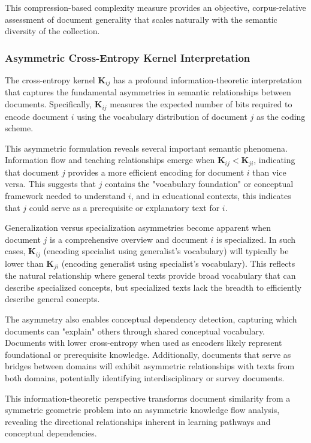 \documentclass[12pt,a4paper]{article}
\begin{document}
This compression-based complexity measure provides an objective, corpus-relative assessment of document generality that scales naturally with the semantic diversity of the collection.


\subsubsection{Asymmetric Cross-Entropy Kernel Interpretation}

The cross-entropy kernel $\mathbf{K}_{ij}$ has a profound information-theoretic interpretation that captures the fundamental asymmetries in semantic relationships between documents. Specifically, $\mathbf{K}_{ij}$ measures the expected number of bits required to encode document $i$ using the vocabulary distribution of document $j$ as the coding scheme.

This asymmetric formulation reveals several important semantic phenomena. Information flow and teaching relationships emerge when $\mathbf{K}_{ij} < \mathbf{K}_{ji}$, indicating that document $j$ provides a more efficient encoding for document $i$ than vice versa. This suggests that $j$ contains the "vocabulary foundation" or conceptual framework needed to understand $i$, and in educational contexts, this indicates that $j$ could serve as a prerequisite or explanatory text for $i$.

Generalization versus specialization asymmetries become apparent when document $j$ is a comprehensive overview and document $i$ is specialized. In such cases, $\mathbf{K}_{ij}$ (encoding specialist using generalist's vocabulary) will typically be lower than $\mathbf{K}_{ji}$ (encoding generalist using specialist's vocabulary). This reflects the natural relationship where general texts provide broad vocabulary that can describe specialized concepts, but specialized texts lack the breadth to efficiently describe general concepts.

The asymmetry also enables conceptual dependency detection, capturing which documents can "explain" others through shared conceptual vocabulary. Documents with lower cross-entropy when used as encoders likely represent foundational or prerequisite knowledge. Additionally, documents that serve as bridges between domains will exhibit asymmetric relationships with texts from both domains, potentially identifying interdisciplinary or survey documents.

This information-theoretic perspective transforms document similarity from a symmetric geometric problem into an asymmetric knowledge flow analysis, revealing the directional relationships inherent in learning pathways and conceptual dependencies.
\end{document}
